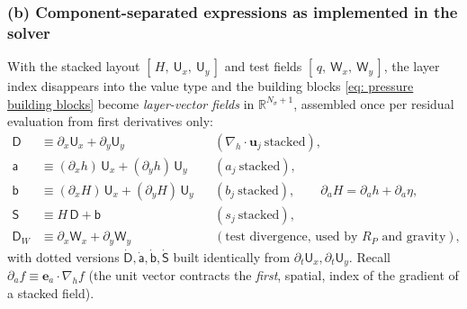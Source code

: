 \documentclass{article}
\newcommand{\Ns}{N_\sigma}
\newcommand{\uj}{\mathbf{u}_j}
\newcommand{\nablah}{\nabla_h}
\begin{document}
\subsubsection*{(b) Component-separated expressions as implemented in the solver}

With the stacked layout $[\,H,\ \mathsf{U}_x,\ \mathsf{U}_y\,]$ and test fields $[\,q,\ \mathsf{W}_x,\ \mathsf{W}_y\,]$, the layer index disappears into the value type and the building blocks \eqref{eq: pressure building blocks} become \emph{layer-vector fields} in $\mathbb{R}^{\Ns+1}$, assembled once per residual evaluation from first derivatives only:
\begin{equation}
\begin{aligned}
    \mathsf{D} &\equiv \partial_x \mathsf{U}_x + \partial_y \mathsf{U}_y  &&(\nablah\cdot\uj \ \text{stacked}),\\
    \mathsf{a} &\equiv (\partial_x h)\,\mathsf{U}_x + (\partial_y h)\,\mathsf{U}_y  &&(a_j \ \text{stacked}),\\
    \mathsf{b} &\equiv (\partial_x H)\,\mathsf{U}_x + (\partial_y H)\,\mathsf{U}_y  &&(b_j \ \text{stacked}),\qquad \partial_a H = \partial_a h + \partial_a \eta,\\
    \mathsf{S} &\equiv H\,\mathsf{D} + \mathsf{b}  &&(s_j \ \text{stacked}),\\
    \mathsf{D}_W &\equiv \partial_x \mathsf{W}_x + \partial_y \mathsf{W}_y  &&(\text{test divergence, used by } R_P \text{ and gravity}),
\end{aligned}
\label{eq: stacked building blocks}
\end{equation}
with dotted versions $\dot{\mathsf{D}},\dot{\mathsf{a}},\dot{\mathsf{b}},\dot{\mathsf{S}}$ built identically from $\partial_t\mathsf{U}_x,\partial_t\mathsf{U}_y$. Recall $\partial_a f \equiv \mathbf{e}_a\cdot\nablah f$ (the unit vector contracts the \emph{first}, spatial, index of the gradient of a stacked field).
\end{document}
